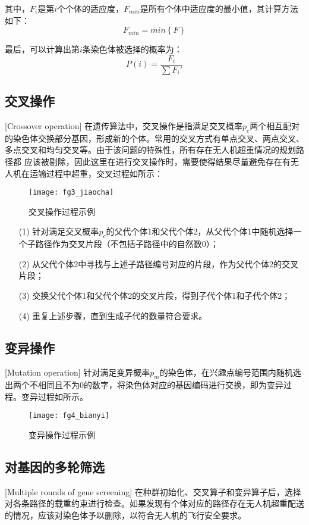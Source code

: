 其中，$F_i$是第$i$个个体的适应度，$F_{min}$是所有个体中适应度的最小值，其计算方法如下：
\begin{equation}
	F_{min} = min\left\{F\right\} 
\end{equation}


最后，可以计算出第$i$条染色体被选择的概率为：
\begin{equation}
	P(i) = \frac{F_i}{\sum F_i'} 
\end{equation}

\subsection{交叉操作}[Crossover operation]
在遗传算法中，交叉操作是指满足交叉概率$p_c$两个相互配对的染色体交换部分基因，形成新的个体。常用的交叉方式有单点交叉、两点交叉、多点交叉和均匀交叉等。由于该问题的特殊性，所有存在无人机超重情况的规划路径都
应该被剔除，因此这里在进行交叉操作时，需要使得结果尽量避免存在有无人机在运输过程中超重，交叉过程如所示：
\begin{figure}[ht]
	\centering
	\texttt{[image: fg3\_jiaocha]}
	\caption{交叉操作过程示例}
	\label{fg401}
\end{figure}


\begin{itemize}
	\item [(1)] 针对满足交叉概率$p_c$的父代个体1和父代个体2，从父代个体1中随机选择一个子路径作为交叉片段（不包括子路径中的自然数0）；
	\item [(2)] 从父代个体2中寻找与上述子路径编号对应的片段，作为父代个体2的交叉片段；
	\item [(3)] 交换父代个体1和父代个体2的交叉片段，得到子代个体1和子代个体2；
 	\item [(4)] 重复上述步骤，直到生成子代的数量符合要求。
\end{itemize}

\subsection{变异操作}[Mutation operation]
针对满足变异概率$p_m$的染色体，在兴趣点编号范围内随机选出两个不相同且不为0的数字，将染色体对应的基因编码进行交换，即为变异过程。变异过程如所示。
\begin{figure}[ht]
	\centering
	\texttt{[image: fg4\_bianyi]}
	\caption{变异操作过程示例}
	\label{fg402}
\end{figure}
\subsection{对基因的多轮筛选}[Multiple rounds of gene screening]
在种群初始化、交叉算子和变异算子后，选择对各条路径的载重约束进行检查。如果发现有个体对应的路径存在无人机超重配送的情况，应该对染色体予以删除，以符合无人机的飞行安全要求。

